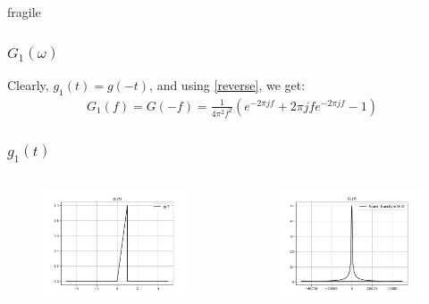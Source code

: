 \documentclass{beamer}
\begin{document}
\begin{frame}{fragile}
\frametitle{$G_1(\omega)$}

\begin{flushleft}
Clearly, $g_1(t) = g(-t)$, and using \eqref{reverse}, we get:
\begin{align}
    G_1(f) = G(-f) = \frac{1}{4\pi^2f^2}(e^{-2\pi jf} + 2\pi jf e^{-2\pi jf} - 1)
\end{align}
\end{flushleft}
\end{frame}

\begin{frame}
  \frametitle{$g_1(t)$}
 \begin{columns}
\begin{column}{0.5\textwidth}
\begin{figure}
\begin{flushleft}
\includegraphics[width=\columnwidth]{graphs/g1.png}

\end{flushleft}
\end{figure}
\end{column}
\begin{column}{0.5\textwidth}
\begin{figure}
\begin{flushleft}
\includegraphics[width=\columnwidth]{graphs/fourier_g1.png}


\end{flushleft}
\end{figure}
\end{column}
\end{columns}
\end{frame}
\end{document}
